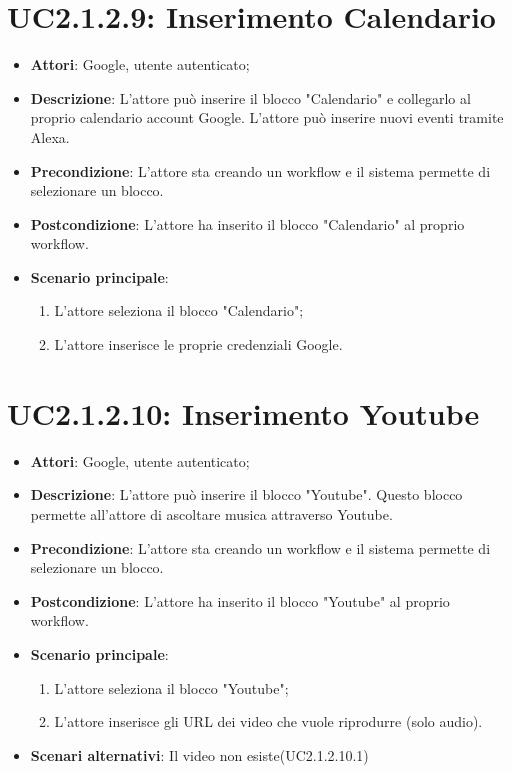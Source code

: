\section{UC2.1.2.9: Inserimento Calendario}
\label{UC2.1.2.9}
\begin{itemize}
	\item \textbf{Attori}: Google, utente autenticato;
	\item \textbf{Descrizione}: L'attore può inserire il blocco "Calendario" e collegarlo al proprio calendario account Google. L'attore può inserire nuovi eventi tramite Alexa.
	\item \textbf{Precondizione}: L'attore sta creando un workflow e il sistema permette di selezionare un blocco.
	\item \textbf{Postcondizione}: L'attore ha inserito il blocco "Calendario" al proprio workflow.
	\item \textbf{Scenario principale}:
	\begin{enumerate} \item L'attore seleziona il blocco "Calendario";  \item  L'attore inserisce le proprie credenziali Google.\end{enumerate}
\end{itemize}

\section{UC2.1.2.10: Inserimento Youtube}
\label{UC2.1.2.10}
\begin{itemize}
	\item \textbf{Attori}: Google, utente autenticato;
	\item \textbf{Descrizione}: L'attore può inserire il blocco "Youtube". Questo blocco permette all'attore di ascoltare musica attraverso Youtube.
	\item \textbf{Precondizione}: L'attore sta creando un workflow e il sistema permette di selezionare un blocco.
	\item \textbf{Postcondizione}: L'attore ha inserito il blocco "Youtube" al proprio workflow.
	\item \textbf{Scenario principale}:
	\begin{enumerate} \item L'attore seleziona il blocco "Youtube";  \item  L'attore inserisce gli URL dei video che vuole riprodurre (solo audio).\end{enumerate}
	\item \textbf{Scenari alternativi}:
	Il video non esiste(UC2.1.2.10.1)
\end{itemize}

